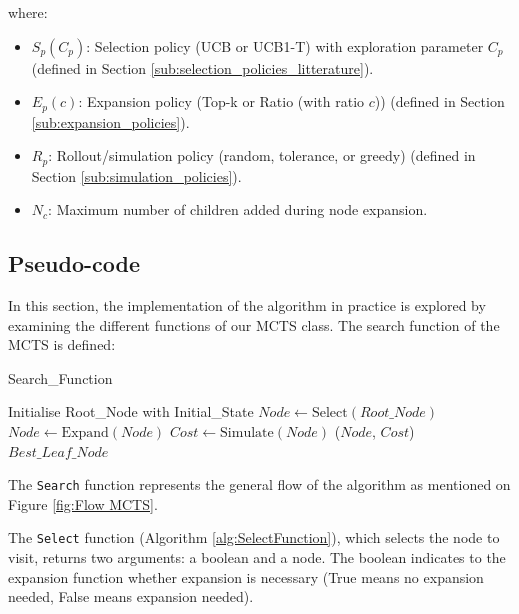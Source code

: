 \documentclass[conference]{IEEEtran}
\begin{document}
where:
\begin{itemize}
    \item $S_p(C_p)$: Selection policy (UCB or UCB1-T) with exploration parameter $C_p$ (defined in Section \ref{sub:selection_policies_litterature}).
    \item $E_p(c)$: Expansion policy (Top-k or Ratio (with ratio $c$)) (defined in Section \ref{sub:expansion_policies}).
    \item $R_p$: Rollout/simulation policy (random, tolerance, or greedy) (defined in Section \ref{sub:simulation_policies}).
    \item $N_c$: Maximum number of children added during node expansion.
\end{itemize}

\subsection{Pseudo-code}
In this section, the implementation of the algorithm in practice is explored by examining the different functions of our MCTS class. The search function of the MCTS is defined:

\begin{algorithm}[H]
    \caption{Search\_Function}
    \label{alg:MCTS}
    \begin{algorithmic}[1]
        \STATE Initialise Root\_Node with Initial\_State
        \STATE $Node \leftarrow \text{Select}(Root\_Node)$
        \STATE $Node \leftarrow \text{Expand}(Node)$
        \ENDIF
        \STATE $Cost \leftarrow \text{Simulate}(Node)$
        \STATE {}($Node$, $Cost$)
        \ENDWHILE
        \RETURN $Best\_Leaf\_Node$
    \end{algorithmic}
\end{algorithm}

The \texttt{Search} function represents the general flow of the algorithm as mentioned on Figure \ref{fig:Flow MCTS}.

The \texttt{Select} function (Algorithm \ref{alg:SelectFunction}), which selects the node to visit, returns two arguments: a boolean and a node. The boolean indicates to the expansion function whether expansion is necessary (True means no expansion needed, False means expansion needed).
\end{document}
